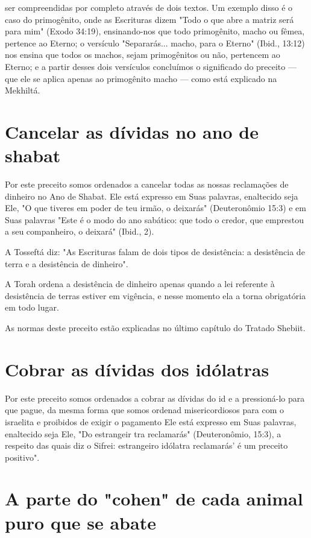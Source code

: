 \begin{itemize}
\begin{enumrate}
\begin{itemize}
\begin{itemize}
\begin{itemize}
ser compreendidas por completo através de dois textos. Um exemplo disso
é o caso do primogênito, onde as Escrituras dizem "Todo o que abre a
matriz será para mim" (Exodo 34:19), ensinando-nos que todo primogênito,
macho ou fêmea, pertence ao Eterno; o versículo "Separarás... macho,
para o Eterno" (Ibid., 13:12) nos ensina que todos os machos, sejam
primogênitos ou não, per­tencem ao Eterno; e a partir desses dois
versículos concluímos o significado do preceito --- que ele se aplica
apenas ao primogênito macho --- como está explicado na Mekhiltá.

\section{Cancelar as dívidas no ano de shabat}

Por este preceito somos ordenados a cancelar todas as nossas
recla­mações de dinheiro no Ano de Shabat. Ele está expresso em Suas
palavras, enal­tecido seja Ele, "O que tiveres em poder de teu irmão, o
deixarás" (Deuteronô­mio 15:3) e em Suas palavras "Este é o modo do ano
sabático: que todo o cre­dor, que emprestou a seu companheiro, o
deixará" (Ibid., 2).

A Tosseftá diz: "As Escrituras falam de dois tipos de desistência: a
desistência de terra e a desistência de dinheiro".

A Torah ordena a desistência de dinheiro apenas quando a lei refe­rente
à desistência de terras estiver em vigência, e nesse momento ela a torna
obrigatória em todo lugar.

As normas deste preceito estão explicadas no último capítulo do Tra­tado
Shebiit.

\section{Cobrar as dívidas dos idólatras}

Por este preceito somos ordenados a cobrar as dívidas do id e a
pressioná-lo para que pague, da mesma forma que somos ordenad
misericordiosos para com o israelita e proibidos de exigir o pagamento
Ele está expresso em Suas palavras, enaltecido seja Ele, "Do estrangeir
tra reclamarás" (Deuteronômio, 15:3), a respeito das quais diz o Sifrei:
estrangeiro idólatra reclamarás' é um preceito positivo".

\section{A parte do "cohen" de cada animal puro que se abate}


\end{itemize}
\end{itemize}
\end{itemize}
\end{enumrate}
\end{itemize}
